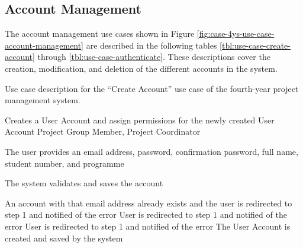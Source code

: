 \FloatBarrier

\subsection{Account Management}
\label{sec:account-management}

The account management use cases shown in Figure \ref{fig:case-4ys-use-case-account-management} are described in the following tables \ref{tbl:use-case-create-account} through \ref{tbl:use-case-authenticate}. These descriptions cover the creation, modification, and deletion of the different accounts in the system.


\begin{table}
  \centering
  \caption{Use case description for the ``Create Account'' use case of the fourth-year project management system.}
  \label{tbl:use-case-create-account}

  \begin{usecase}
    Creates a User Account and assign permissions for the newly created User Account
    Project Group Member, Project Coordinator
    \ucnormal
    \begin{ucenum}
      \item The user provides an email address, password, confirmation password, full name, student number, and programme
      \item The system validates and saves the account
    \end{ucenum}
    An account with that email address already exists and the user is redirected to step 1 and notified of the error
    User is redirected to step 1 and notified of the error
    User is redirected to step 1 and notified of the error
    The User Account is created and saved by the system
  \end{usecase}
\end{table}


